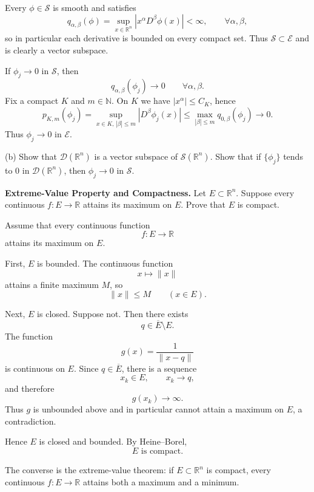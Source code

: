 \begin{solution}
Every $\phi\in\mathcal{S}$ is smooth and satisfies
	\[
	q_{\alpha,\beta}(\phi)
	= \sup_{x\in\mathbb{R}^n} |x^\alpha D^\beta\phi(x)| <\infty,
	\qquad \forall\alpha,\beta,
	\]
	so in particular each derivative is bounded on every compact set.
	Thus $\mathcal{S}\subset\mathcal{E}$ and is clearly a vector subspace.

	If $\phi_j\to 0$ in $\mathcal{S}$, then
	\[
	q_{\alpha,\beta}(\phi_j)\to 0
	\qquad\forall\alpha,\beta.
	\]
	Fix a compact $K$ and $m\in\mathbb{N}$.  On $K$ we have $|x^\alpha|\le C_K$,
	hence
	\[
	p_{K,m}(\phi_j)
	= \sup_{x\in K,\,|\beta|\le m} |D^\beta\phi_j(x)|
	\le \max_{|\beta|\le m} q_{0,\beta}(\phi_j)
	\to 0.
	\]
	Thus $\phi_j\to 0$ in $\mathcal{E}$.

	\par\noindent (b)\quad
	Show that $\mathcal{D}(\mathbb{R}^n)$ is a vector subspace of
	$\mathcal{S}(\mathbb{R}^n)$.  Show that if $\{\phi_j\}$ tends to $0$ in
	$\mathcal{D}(\mathbb{R}^n)$, then $\phi_j\to 0$ in $\mathcal{S}$.

	\medskip
\end{solution}

\begin{problem}[CP-II-0568]
\label{prob:cp-ii-0568}
\textbf{Extreme-Value Property and Compactness.}
Let \(E\subset\mathbb R^n\). Suppose every continuous \(f:E\to\mathbb R\) attains its maximum on \(E\). Prove that \(E\) is compact.
\end{problem}

\begin{solution}
Assume that every continuous function
\[
f:E\to\mathbb R
\]
attains its maximum on \(E\).

First, \(E\) is bounded. The continuous function
\[
x\longmapsto \|x\|
\]
attains a finite maximum \(M\), so
\[
\|x\|\le M
\qquad(x\in E).
\]

Next, \(E\) is closed. Suppose not. Then there exists
\[
q\in\overline E\setminus E.
\]
The function
\[
g(x)=\frac1{\|x-q\|}
\]
is continuous on \(E\). Since \(q\in\overline E\), there is a sequence
\[
x_k\in E,
\qquad
x_k\to q,
\]
and therefore
\[
g(x_k)\to\infty.
\]
Thus \(g\) is unbounded above and in particular cannot attain a maximum on \(E\), a
contradiction.

Hence \(E\) is closed and bounded. By Heine--Borel,
\[
\boxed{E\text{ is compact}.}
\]

The converse is the extreme-value theorem: if \(E\subset\mathbb R^n\) is compact, every
continuous \(f:E\to\mathbb R\) attains both a maximum and a minimum.
\end{solution}


